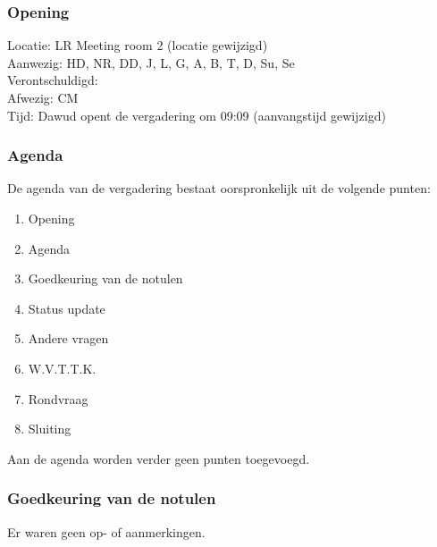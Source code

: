 \subsubsection{Opening}
Locatie: LR Meeting room 2 (locatie gewijzigd)\\
Aanwezig: HD, NR, DD, J, L, G, A, B, T, D, Su, Se\\
Verontschuldigd: \\
Afwezig: CM \\
Tijd: Dawud opent de vergadering om 09:09 (aanvangstijd gewijzigd)\\

\subsubsection{Agenda}
De agenda van de vergadering bestaat oorspronkelijk uit de volgende punten:
\begin{enumerate}
\item Opening
\item Agenda
\item Goedkeuring van de notulen
\item Status update
\item Andere vragen
\item W.V.T.T.K.
\item Rondvraag
\item Sluiting
\end{enumerate}

Aan de agenda worden verder geen punten toegevoegd.

\subsubsection{Goedkeuring van de notulen}
Er waren geen op- of aanmerkingen.

